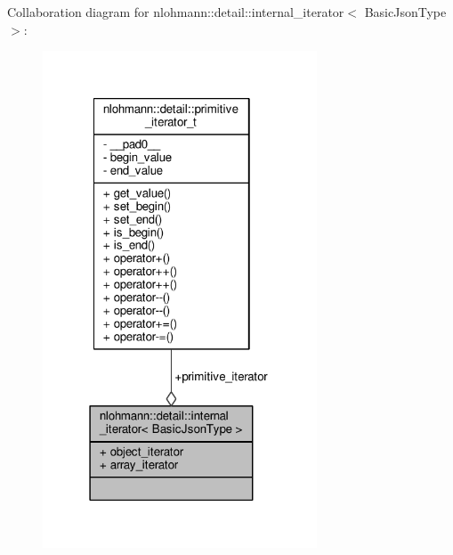 Collaboration diagram for nlohmann\+:\+:detail\+:\+:internal\+\_\+iterator$<$ Basic\+Json\+Type $>$\+:
\nopagebreak
\begin{figure}[H]
\begin{center}
\leavevmode
\includegraphics[width=231pt]{structnlohmann_1_1detail_1_1internal__iterator__coll__graph}
\end{center}
\end{figure}
